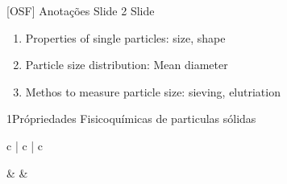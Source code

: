 \documentclass[\mainfilename]{subfiles}
\begin{document}
[OSF]
{Anotações Slide 2} %
{Slide} %

\begin{enumerate}[label ={\arabic{part}.\arabic{enumi}}]
    \item Properties of single particles: size, shape
    \item Particle size distribution: Mean diameter
    \item Methos to measure particle size: sieving, elutriation
\end{enumerate}

\begin{sectionBox}1{Própriedades Fisicoquímicas de particulas sólidas} %
    
    
    \setlength\tabcolsep{2mm}        %
    \renewcommand\arraystretch{1.25} %

    \begin{table}[H]\centering
        \begin{tabular}{c | c | c}
            
            \toprule
            
            &   
            &   
            
            \\[1.5em]
                

\end{tabular}
\end{table}
\end{sectionBox}
\end{document}
